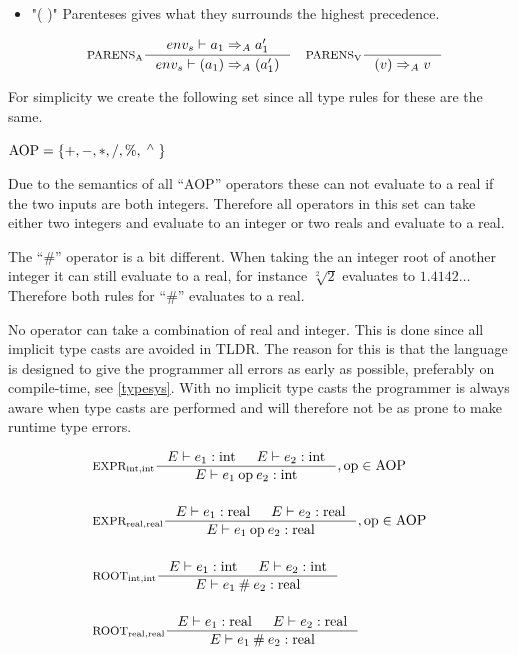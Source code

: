 \begin{itemize}
\item "( )" Parenteses gives what they surrounds the highest precedence.

\begin{align*}
&\inference[$\text{PARENS}_\text{A}$]{env_s\vdash a_1 \Rightarrow_A a_1'}
                       {env_s\vdash (a_1) \Rightarrow_A (a_1')}
&
&\inference[$\text{PARENS}_\text{V}$]{}
                       {(v) \Rightarrow_A v}
\end{align*}
\end{itemize}

For simplicity we create the following set since all type rules for these are the same.

\begin{center}
$\text{AOP} = \left\{ {+, -, *, /, \%, \; ^\wedge{} \;} \right\}$
\end{center}

Due to the semantics of all \enquote{AOP} operators these can not evaluate to a real if the two inputs are both integers. Therefore all operators in this set can take either two integers and evaluate to an integer or two reals and evaluate to a real.

The \enquote{\#} operator is a bit different. When taking the an integer root of another integer it can still evaluate to a real, for instance $\sqrt[2]{2}$ evaluates to $1.4142\dots$ Therefore both rules for \enquote{\#} evaluates to a real.

No operator can take a combination of real and integer. This is done since all implicit type casts are avoided in TLDR. The reason for this is that the language is designed to give the programmer all errors as early as possible, preferably on compile-time, see \cref{typesys}. With no implicit type casts the programmer is always aware when type casts are performed and will therefore not be as prone to make runtime type errors.

\begin{align*}
&\inference[$\text{EXPR}_{\Tint,\Tint}$]{\Tenv e_1  : \Tint & 
                       \Tenv e_2 : \Tint}
                    {\Tenv e_1 \mathbin{\text{op}} e_2 : \Tint},  \text{op} \in \Taop
\\\\
&\inference[$\text{EXPR}_{\Treal,\Treal}$]{\Tenv e_1 : \Treal & 
                       \Tenv e_2 : \Treal}
                    {\Tenv e_1 \mathbin{\text{op}} e_2 : \Treal},  \text{op} \in \Taop
\\\\
&\inference[$\text{ROOT}_{\Tint,\Tint}$]{\Tenv e_1 : \Tint &
                       \Tenv e_2 : \Tint}
                    {\Tenv e_1 \mathbin{\#} e_2 : \Treal}
\\\\
&\inference[$\text{ROOT}_{\Treal,\Treal}$]{\Tenv e_1 : \Treal &
                       \Tenv e_2 : \Treal}
                    {\Tenv e_1 \mathbin{\#} e_2 : \Treal}
\end{align*}


